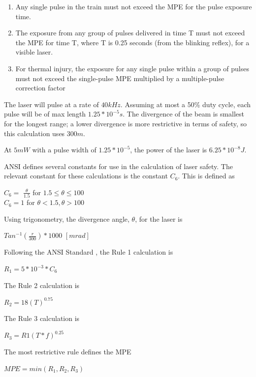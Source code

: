 \documentclass[letterpaper,10pt]{article}
\begin{document}
\begin{spacing}{1.15}
\begin{enumerate}
	\item Any single pulse in the train must not exceed the MPE for the pulse exposure time.
	\item The exposure from any group of pulses delivered in time T must not exceed the MPE for
	time T, where T is 0.25 seconds (from the blinking reflex), for a visible laser. 
	\item For thermal injury, the exposure for any single pulse within a group of pulses must not
	exceed the single-pulse MPE multiplied by a multiple-pulse correction factor
\end{enumerate}

The laser will pulse at a rate of $40 kHz$. Assuming at most a 50\% duty cycle, each pulse will be of max length $1.25*10^{-5} s$. The divergence of the beam is smallest for the longest range; a lower divergence is more restrictive in terms of safety, so this calculation uses $300m$. 

At $5mW$ with a pulse width of $1.25*10^{-5}$, the power of the laser is $6.25*10^{-8} J$. 

ANSI defines several constants for use in the calculation of laser safety. The relevant constant for these calculations is the constant $C_6$. This is defined as 
\begin{center}
	\large
	$C_6 =$
	$\frac{\theta}{1.5}$ for $1.5 \leq \theta \leq 100$\\
	$C_6 = 1$ for $\theta < 1.5, \theta > 100$
\end{center}

Using trigonometry, the divergence angle, $\theta$, for the laser is 
\begin{center}
	\large
	$Tan^{-1}(\frac{r}{300})* 1000$ $[mrad]$
\end{center}

Following the ANSI Standard \cite{ANSI}, the Rule 1 calculation is 
\begin{center}
	\large
    $R_1 = 5*10^{-3} * C_6$
\end{center}

The Rule 2 calculation is
\begin{center}
	\large
	$R_2 = 18 (T)^{0.75}$
\end{center}

The Rule 3 calculation is
\begin{center}
	\large
	$R_3 = R1(T*f)^{0.25}$
\end{center}

The most restrictive rule defines the MPE 
\begin{center}
	\large
	$MPE = min(R_1, R_2, R_3)$
\end{center}


\end{spacing}
\end{document}
